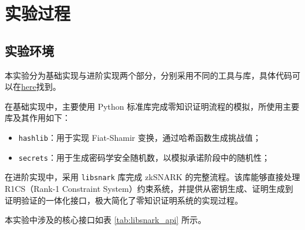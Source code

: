 \documentclass[a4paper]{article}
\begin{document}





\section{实验过程}
\subsection{实验环境}

本实验分为基础实现与进阶实现两个部分，分别采用不同的工具与库，具体代码可以在\href{https://github.com/Absurdaaa/NKU_CS_courses/tree/main/\%E6\%95\%B0\%E6\%8D\%AE\%E5\%AE\%89\%E5\%85\%A8/lab/lab2}{here}找到。

在基础实现中，主要使用 Python 标准库完成零知识证明流程的模拟，所使用主要库及其作用如下：
\begin{itemize}
    \item \texttt{hashlib}：用于实现 Fiat-Shamir 变换，通过哈希函数生成挑战值；
    \item \texttt{secrets}：用于生成密码学安全随机数，以模拟承诺阶段中的随机性；
\end{itemize}

在进阶实现中，采用 \texttt{libsnark} 库完成 zkSNARK 的完整流程。该库能够直接处理 R1CS（Rank-1 Constraint System）约束系统，并提供从密钥生成、证明生成到证明验证的一体化接口，极大简化了零知识证明系统的实现过程。

本实验中涉及的核心接口如表 \ref{tab:libsnark_api} 所示。
\end{document}
